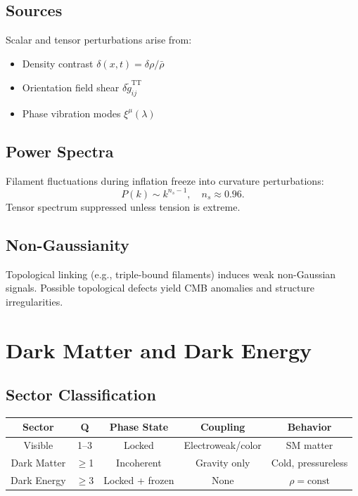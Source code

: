 \documentclass[11pt]{article}
\begin{document}
\subsection{Sources}
Scalar and tensor perturbations arise from:
\begin{itemize}
  \item Density contrast \( \delta(x,t) = \delta\rho / \bar\rho \)
  \item Orientation field shear \( \delta\tilde g_{ij}^{\text{TT}} \)
  \item Phase vibration modes \( \xi^\mu(\lambda) \)
\end{itemize}

\subsection{Power Spectra}
Filament fluctuations during inflation freeze into curvature perturbations:
\[
P(k) \sim k^{n_s - 1}, \quad n_s \approx 0.96.
\]
Tensor spectrum suppressed unless tension is extreme.

\subsection{Non-Gaussianity}
Topological linking (e.g., triple-bound filaments) induces weak non-Gaussian signals.
Possible topological defects yield CMB anomalies and structure irregularities.

\section{Dark Matter and Dark Energy}

\subsection{Sector Classification}

\begin{center}
\begin{tabular}{|c|c|c|c|c|}
\hline
Sector & Q & Phase State & Coupling & Behavior \\\hline
Visible & 1--3 & Locked & Electroweak/color & SM matter \\
Dark Matter & $\geq$1 & Incoherent & Gravity only & Cold, pressureless \\
Dark Energy & $\geq$3 & Locked + frozen & None & $\rho=\text{const}$ \\\hline
\end{tabular}
\end{center}
\end{document}
